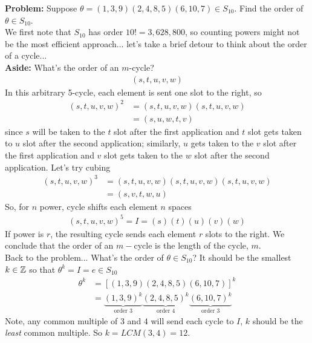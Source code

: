 \begin{example}
\textbf{Problem:} Suppose $\theta = (1,3,9)(2,4,8,5)(6,10,7)\in S_{10}$. Find the order of $\theta \in S_{10}$. \steezybreak\\
We first note that $S_{10}$ has order $10!=3,628,800$, so counting powers might not be the most efficient approach... let's take a brief detour to think about the order of a cycle... \steezybreak\\
\textbf{Aside:} What's the order of an $m$-cycle?
\begin{align}
    (s,t,u,v,w) \nonumber
\end{align}
In this arbitrary 5-cycle, each element is sent one slot to the right, so
\begin{align}
    (s,t,u,v,w)^2 &= (s,t,u,v,w)(s,t,u,v,w)\nonumber \\
    &= (s,u,w,t,v) \nonumber
\end{align}
since $s$ will be taken to the $t$ slot after the first application and $t$ slot gets taken to $u$ slot after the second application; similarly, $u$ gets taken to the $v$ slot after the first application and $v$ slot gets taken to the $w$ slot after the second application. Let's try cubing
\begin{align}
    (s,t,u,v,w)^3&=(s,t,u,v,w)(s,t,u,v,w)(s,t,u,v,w) \nonumber \\
    &= (s,v,t,w,u) \nonumber
\end{align}
So, for $n$ power, cycle shifts each element $n$ spaces
\begin{align}
    (s,t,u,v,w)^5=I=(s)(t)(u)(v)(w)\nonumber
\end{align}
If power is $r$, the resulting cycle sends each element $r$ slots to the right. We conclude that the order of an $m-$cycle is the length of the cycle, $m$. \steezybreak\\
Back to the problem... What's the order of $\theta \in S_{10}$? It should be the smallest $k\in {\mathbb{ Z}}$ so that $\theta^k= I = e \in S_{10}$
\begin{align}
    \theta^k&=[(1,3,9)(2,4,8,5)(6,10,7)]^k \nonumber \\
    &= \underbrace{(1,3,9)^k}_{\text{order }3}\underbrace{(2,4,8,5)^k}_{\text{order }4}\underbrace{(6,10,7)^k}_{\text{order }3} \nonumber
\end{align}
Note, any common multiple of $3$ and $4$ will send each cycle to $I$, $k$ should be the \textit{least} common multiple. So $k=LCM(3,4)=12$.
\end{example}

